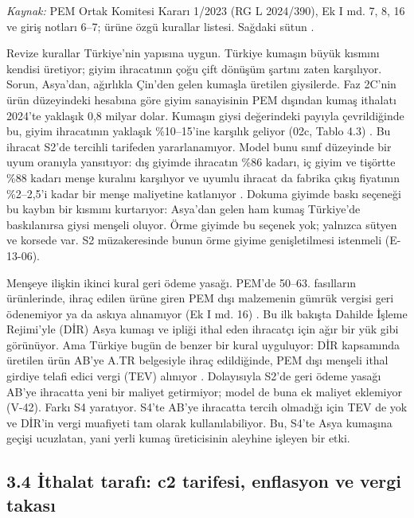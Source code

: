 \endgroup

\emph{Kaynak:} \etiketV{} PEM Ortak Komitesi Kararı 1/2023 (RG L 2024/390), Ek I md. 7, 8, 16 ve giriş notları 6--7; ürüne özgü kurallar listesi. Sağdaki sütun \etiketH{}.

Revize kurallar Türkiye'nin yapısına uygun. Türkiye kumaşın büyük kısmını kendisi üretiyor; giyim ihracatının çoğu çift dönüşüm şartını zaten karşılıyor. Sorun, Asya'dan, ağırlıkla Çin'den gelen kumaşla üretilen giysilerde. Faz 2C'nin ürün düzeyindeki hesabına göre giyim sanayisinin PEM dışından kumaş ithalatı 2024'te yaklaşık 0,8 milyar dolar. Kumaşın giysi değerindeki payıyla çevrildiğinde bu, giyim ihracatının yaklaşık \%10--15'ine karşılık geliyor (02c, Tablo 4.3) \etiketH{}. Bu ihracat S2'de tercihli tarifeden yararlanamıyor. Model bunu sınıf düzeyinde bir uyum oranıyla yansıtıyor: dış giyimde ihracatın \%86 kadarı, iç giyim ve tişörtte \%88 kadarı menşe kuralını karşılıyor ve uyumlu ihracat da fabrika çıkış fiyatının \%2--2,5'i kadar bir menşe maliyetine katlanıyor \etiketH{}. Dokuma giyimde baskı seçeneği bu kaybın bir kısmını kurtarıyor: Asya'dan gelen ham kumaş Türkiye'de baskılanırsa giysi menşeli oluyor. Örme giyimde bu seçenek yok; yalnızca sütyen ve korsede var. S2 müzakeresinde bunun örme giyime genişletilmesi istenmeli (E-13-06).

Menşeye ilişkin ikinci kural geri ödeme yasağı. PEM'de 50--63. fasılların ürünlerinde, ihraç edilen ürüne giren PEM dışı malzemenin gümrük vergisi geri ödenemiyor ya da askıya alınamıyor (Ek I md. 16) \etiketV{}. Bu ilk bakışta Dahilde İşleme Rejimi'yle (DİR) Asya kumaşı ve ipliği ithal eden ihracatçı için ağır bir yük gibi görünüyor. Ama Türkiye bugün de benzer bir kural uyguluyor: DİR kapsamında üretilen ürün AB'ye A.TR belgesiyle ihraç edildiğinde, PEM dışı menşeli ithal girdiye telafi edici vergi (TEV) alınıyor \etiketV{}. Dolayısıyla S2'de geri ödeme yasağı AB'ye ihracatta yeni bir maliyet getirmiyor; model de buna ek maliyet eklemiyor (V-42). Farkı S4 yaratıyor. S4'te AB'ye ihracatta tercih olmadığı için TEV de yok ve DİR'in vergi muafiyeti tam olarak kullanılabiliyor. Bu, S4'te Asya kumaşına geçişi ucuzlatan, yani yerli kumaş üreticisinin aleyhine işleyen bir etki.

\hypertarget{nace_kartlar_13-15-34-iux307thalat-tarafux131-c2-tarifesi-enflasyon-ve-vergi-takasux131}{%
\subsection{3.4 İthalat tarafı: c2 tarifesi, enflasyon ve vergi takası}\label{nace_kartlar_13-15-34-iux307thalat-tarafux131-c2-tarifesi-enflasyon-ve-vergi-takasux131}}

